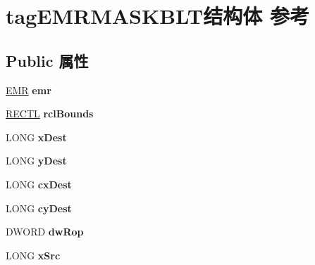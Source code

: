 \hypertarget{structtag_e_m_r_m_a_s_k_b_l_t}{}\section{tag\+E\+M\+R\+M\+A\+S\+K\+B\+L\+T结构体 参考}
\label{structtag_e_m_r_m_a_s_k_b_l_t}
\subsection*{Public 属性}
\begin{DoxyCompactItemize}
\item 
\mbox{\label{structtag_e_m_r_m_a_s_k_b_l_t_a6588cad2f3b9562eb5b3cfdf52d0715f}} 
\hyperlink{structtag_e_m_r}{E\+MR} {\bfseries emr}
\item 
\mbox{\label{structtag_e_m_r_m_a_s_k_b_l_t_a02a8314a4924041c21a374054e2542ce}} 
\hyperlink{struct___r_e_c_t_l}{R\+E\+C\+TL} {\bfseries rcl\+Bounds}
\item 
\mbox{\label{structtag_e_m_r_m_a_s_k_b_l_t_ad530973d787834cc9ba193cc14e26396}} 
L\+O\+NG {\bfseries x\+Dest}
\item 
\mbox{\label{structtag_e_m_r_m_a_s_k_b_l_t_a83dbc45c0cb37f39d56ffb778b2f210e}} 
L\+O\+NG {\bfseries y\+Dest}
\item 
\mbox{\label{structtag_e_m_r_m_a_s_k_b_l_t_af8f7bfb3f60bc73cac88e5ab011c5bd1}} 
L\+O\+NG {\bfseries cx\+Dest}
\item 
\mbox{\label{structtag_e_m_r_m_a_s_k_b_l_t_ad26c9bd70dbf1a9ab3ceee9f575bf886}} 
L\+O\+NG {\bfseries cy\+Dest}
\item 
\mbox{\label{structtag_e_m_r_m_a_s_k_b_l_t_a8ec2afe65bd50b878108226094a1d098}} 
D\+W\+O\+RD {\bfseries dw\+Rop}
\item 
\mbox{\label{structtag_e_m_r_m_a_s_k_b_l_t_a2ebdcc2f3b4f5392b176334a6ea8dcff}} 
L\+O\+NG {\bfseries x\+Src}
\item 

\end{DoxyCompactItemize}
